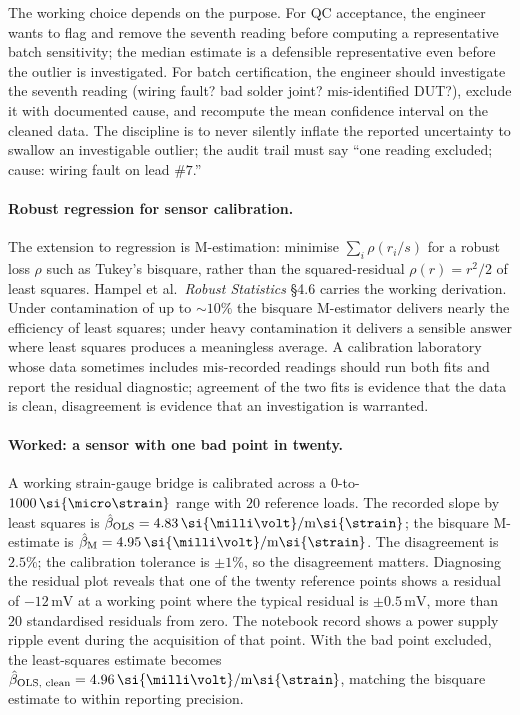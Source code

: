 The working choice depends on the purpose. For QC acceptance,
the engineer wants to flag and remove the seventh reading
before computing a representative batch sensitivity; the
median estimate is a defensible representative even before
the outlier is investigated. For batch certification, the
engineer should investigate the seventh reading
(wiring fault? bad solder joint? mis-identified DUT?),
exclude it with documented cause, and recompute the mean
confidence interval on the cleaned data. The discipline is
to never silently inflate the reported uncertainty to swallow
an investigable outlier; the audit trail must say
``one reading excluded; cause: wiring fault on lead $\#7$.''

\paragraph{Robust regression for sensor calibration.} The
extension to regression is M-estimation: minimise
$\sum_{i} \rho(r_{i}/s)$ for a robust loss $\rho$ such as
Tukey's bisquare, rather than the squared-residual $\rho(r) =
r^{2}/2$ of least squares. Hampel et al.\ \emph{Robust
Statistics} \cite{paper:hampel-1986} \S 4.6 carries the
working derivation. Under contamination of up to $\sim 10\%$
the bisquare M-estimator delivers nearly the efficiency of
least squares; under heavy contamination it delivers a
sensible answer where least squares produces a meaningless
average. A calibration laboratory whose data sometimes
includes mis-recorded readings should run both fits and
report the residual diagnostic; agreement of the two fits is
evidence that the data is clean, disagreement is evidence
that an investigation is warranted.

\paragraph{Worked: a sensor with one bad point in twenty.} A
working strain-gauge bridge is calibrated across a $0$-to-
$1000\,\si{\micro\strain}$ range with $20$ reference loads.
The recorded slope by least squares is $\hat{\beta}_{
\text{OLS}} = 4.83\,\si{\milli\volt}/\text{m}\si{\strain}$;
the bisquare M-estimate is $\hat{\beta}_{\text{M}} =
4.95\,\si{\milli\volt}/\text{m}\si{\strain}$. The
disagreement is $2.5\%$; the calibration tolerance is
$\pm 1\%$, so the disagreement matters. Diagnosing the
residual plot reveals that one of the twenty reference points
shows a residual of $-12\,\si{\milli\volt}$ at a working
point where the typical residual is $\pm 0.5\,\si{\milli
\volt}$, more than $20$ standardised residuals from zero. The
notebook record shows a power supply ripple event during the
acquisition of that point. With the bad point excluded, the
least-squares estimate becomes $\hat{\beta}_{\text{OLS,
clean}} = 4.96\,\si{\milli\volt}/\text{m}\si{\strain}$,
matching the bisquare estimate to within reporting precision.

